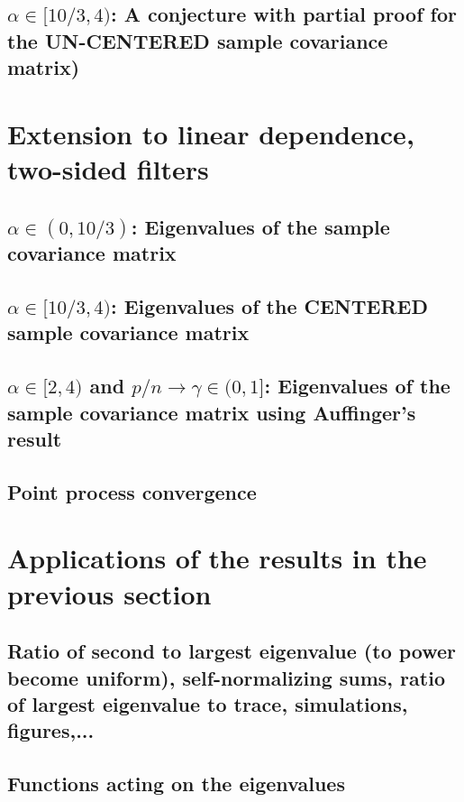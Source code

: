 \documentclass[11pt,reqno]{amsart}
\newcommand{\1}{\mathds{1}}
\newcommand{\0}{\boldsymbol{0}}
\newcommand{\4}{\mathchoice{\mskip1.5mu}{\mskip1.5mu}{}{}}
\newcommand{\5}{\mathchoice{\mskip-1.5mu}{\mskip-1.5mu}{}{}}
\newcommand{\2}{\penalty250\mskip\thickmuskip\mskip-\thinmuskip} %
\begin{document}
\subsection{\texorpdfstring{$\alpha \in [10/3,4)$}{alpha in [10/3,4)}: A conjecture with partial proof for
  the UN-CENTERED sample covariance matrix)}

\section{Extension to linear dependence, two-sided filters}

\subsection{\texorpdfstring{$\alpha \in (0,10/3)$}{alpha in (0,10/3)}: Eigenvalues of the sample covariance matrix}
\subsection{\texorpdfstring{$\alpha \in [10/3,4)$}{alpha in [10/3,4)}: Eigenvalues of the CENTERED sample covariance matrix}
\subsection{\texorpdfstring{$\alpha \in [2,4)$}{alpha in [2,4)} and
  \texorpdfstring{$p/n \to \gamma \in (0,1]$}{p/n tends to gamma in (0,1]}:
  Eigenvalues of the sample covariance matrix using Auffinger's
  result}
\subsection{Point process convergence}

\section{Applications of the results in the previous section}

\subsection{Ratio of second to largest eigenvalue (to power become uniform), self-normalizing sums, ratio of largest eigenvalue to trace, simulations, figures,...}
\subsection{Functions acting on the eigenvalues}
\end{document}
